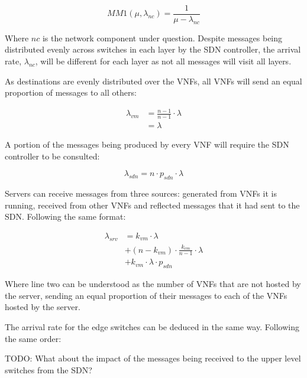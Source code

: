 \begin{equation}
\label{eq:MM1_time_in_network}
MM1(\mu, \lambda_{nc}) = \frac{1}{\mu - \lambda_{nc}}
\end{equation}

Where $nc$ is the network component under question. Despite messages being distributed evenly across switches in each layer by the SDN controller, the arrival rate, $\lambda_{nc}$, will be different for each layer as not all messages will visit all layers.

As destinations are evenly distributed over the VNFs, all VNFs will send an equal proportion of messages to all others:

\begin{equation}
\label{eq:arr_vnf}
\begin{split}
\lambda_{vm} &= \frac{n - 1}{n - 1} \cdot \lambda \\
			 &= \lambda
\end{split}
\end{equation}

A portion of the messages being produced by every VNF will require the SDN controller to be consulted:

\begin{equation}
\label{eq:arr_sdn}
\lambda_{sdn} = n \cdot p_{sdn} \cdot \lambda
\end{equation}

Servers can receive messages from three sources: generated from VNFs it is running, received from other VNFs and reflected messages that it had sent to the SDN. Following the same format:

\begin{equation}
\label{eq:arr_srv}
\begin{split}
\lambda_{srv} &= k_{vm} \cdot \lambda \\
			  &+ (n - k_{vm}) \cdot  \frac{k_{vm}}{n - 1} \cdot \lambda \\
			  &+ k_{vm} \cdot \lambda \cdot p_{sdn}
\end{split}
\end{equation}

Where line two can be understood as the number of VNFs that are not hosted by the server, sending an equal proportion of their messages to each of the VNFs hosted by the server.

The arrival rate for the edge switches can be deduced in the same way. Following the same order:

TODO: What about the impact of the messages being received to the upper level switches from the SDN?

